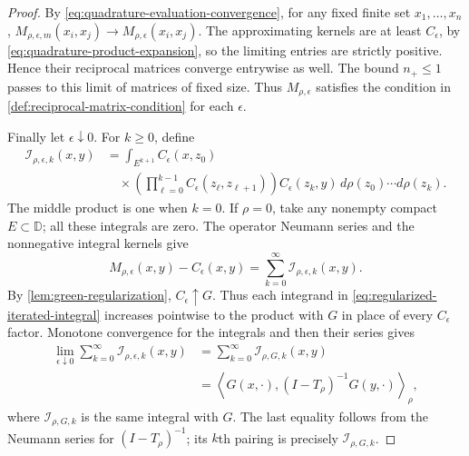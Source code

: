\begin{proof}
By \eqref{eq:quadrature-evaluation-convergence}, for any fixed
finite set $x_1,\ldots,x_n$,
$M_{\rho,\epsilon,m}(x_i,x_j)\to M_{\rho,\epsilon}(x_i,x_j)$.
The approximating kernels are at least $C_\epsilon$, by
\eqref{eq:quadrature-product-expansion}, so the limiting entries
are strictly positive. Hence their reciprocal matrices converge
entrywise as well. The bound $n_+\le1$ passes to this limit of
matrices of fixed size. Thus $M_{\rho,\epsilon}$ satisfies
the condition in \cref{def:reciprocal-matrix-condition} for each $\epsilon$.

Finally let $\epsilon\downarrow0$. For $k\ge0$, define
\begin{equation}\label{eq:regularized-iterated-integral}
 \begin{aligned}
 \mathcal I_{\rho,\epsilon,k}(x,y)
 &=\int_{E^{k+1}}C_\epsilon(x,z_0)\\
 &\quad{}\times\left(\prod_{\ell=0}^{k-1}C_\epsilon(z_\ell,z_{\ell+1})\right)
   C_\epsilon(z_k,y)\,
   d\rho(z_0)\cdots d\rho(z_k).
 \end{aligned}
\end{equation}
The middle product is one when $k=0$. If $\rho=0$, take any
nonempty compact $E\subset\mathbb D$; all these integrals are zero.
The operator Neumann series and the nonnegative integral kernels give
\begin{equation}\label{eq:regularized-correction-series}
 M_{\rho,\epsilon}(x,y)-C_\epsilon(x,y)
 =\sum_{k=0}^\infty\mathcal I_{\rho,\epsilon,k}(x,y).
\end{equation}
By \cref{lem:green-regularization}, $C_\epsilon\uparrow G$.
Thus each integrand in \eqref{eq:regularized-iterated-integral}
increases pointwise to the product with $G$ in place of every
$C_\epsilon$ factor. Monotone convergence for the integrals and
then their series gives
\begin{equation}\label{eq:green-correction-limit}
 \begin{aligned}
 \lim_{\epsilon\downarrow0}
 \sum_{k=0}^\infty\mathcal I_{\rho,\epsilon,k}(x,y)
 &=\sum_{k=0}^\infty\mathcal I_{\rho,G,k}(x,y)\\
 &=\left\langle G(x,\cdot),(I-T_\rho)^{-1}G(y,\cdot)
   \right\rangle_\rho,
 \end{aligned}
\end{equation}
where $\mathcal I_{\rho,G,k}$ is the same integral with $G$.
The last equality follows from the Neumann series for
$(I-T_\rho)^{-1}$; its $k$th pairing is precisely
$\mathcal I_{\rho,G,k}$.


\end{proof}
